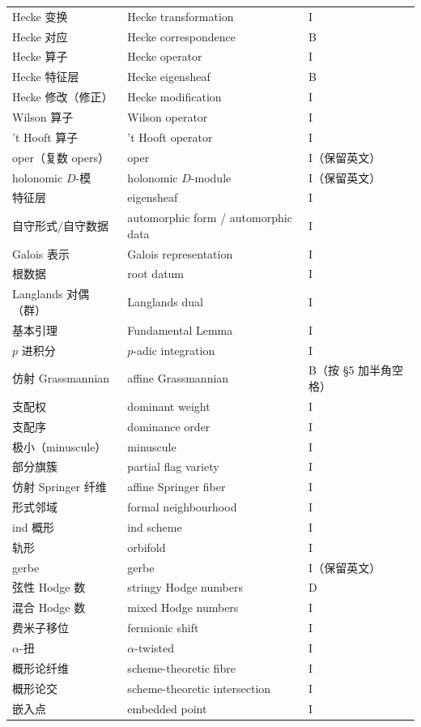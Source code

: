 \begin{longtable}{@{}p{5.4cm}p{6.3cm}p{2.2cm}@{}}
Hecke 变换 & Hecke transformation & I\\
Hecke 对应 & Hecke correspondence & B\\
Hecke 算子 & Hecke operator & I\\
Hecke 特征层 & Hecke eigensheaf & B\\
Hecke 修改（修正） & Hecke modification & I\\
Wilson 算子 & Wilson operator & I\\
't Hooft 算子 & 't Hooft operator & I\\
oper（复数 opers） & oper & I（保留英文）\\
holonomic $D$-模 & holonomic $D$-module & I（保留英文）\\
特征层 & eigensheaf & I\\
自守形式/自守数据 & automorphic form / automorphic data & I\\
Galois 表示 & Galois representation & I\\
根数据 & root datum & I\\
Langlands 对偶（群） & Langlands dual & I\\
基本引理 & Fundamental Lemma & I\\
$p$ 进积分 & $p$-adic integration & I\\
仿射 Grassmannian & affine Grassmannian & B（按 §5 加半角空格）\\
支配权 & dominant weight & I\\
支配序 & dominance order & I\\
极小（minuscule） & minuscule & I\\
部分旗簇 & partial flag variety & I\\
仿射 Springer 纤维 & affine Springer fiber & I\\
形式邻域 & formal neighbourhood & I\\
ind 概形 & ind scheme & I\\
轨形 & orbifold & I\\
gerbe & gerbe & I（保留英文）\\
弦性 Hodge 数 & stringy Hodge numbers & D\\
混合 Hodge 数 & mixed Hodge numbers & I\\
费米子移位 & fermionic shift & I\\
$\alpha$-扭 & $\alpha$-twisted & I\\
概形论纤维 & scheme-theoretic fibre & I\\
概形论交 & scheme-theoretic intersection & I\\
嵌入点 & embedded point & I\\

\end{longtable}
